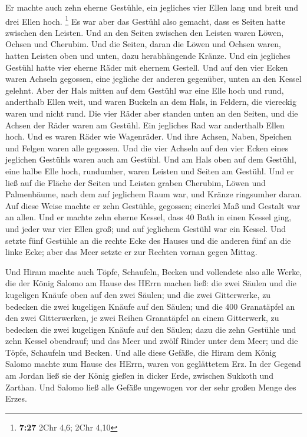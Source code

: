  Er machte auch zehn eherne Gestühle, ein jegliches vier
Ellen lang und breit und drei Ellen hoch. \footnote{\textbf{7:27} 2Chr
  4,6; 2Chr 4,10}  Es war aber das Gestühl also gemacht,
dass es Seiten hatte zwischen den Leisten.  Und an den
Seiten zwischen den Leisten waren Löwen, Ochsen und Cherubim. Und die
Seiten, daran die Löwen und Ochsen waren, hatten Leisten oben und unten,
dazu herabhängende Kränze.  Und ein jegliches Gestühl hatte
vier eherne Räder mit ehernem Gestell. Und auf den vier Ecken waren
Achseln gegossen, eine jegliche der anderen gegenüber, unten an den
Kessel gelehnt.  Aber der Hals mitten auf dem Gestühl war
eine Elle hoch und rund, anderthalb Ellen weit, und waren Buckeln an dem
Hals, in Feldern, die viereckig waren und nicht rund.  Die
vier Räder aber standen unten an den Seiten, und die Achsen der Räder
waren am Gestühl. Ein jegliches Rad war anderthalb Ellen hoch.
 Und es waren Räder wie Wagenräder. Und ihre Achsen, Naben,
Speichen und Felgen waren alle gegossen.  Und die vier
Achseln auf den vier Ecken eines jeglichen Gestühls waren auch am
Gestühl.  Und am Hals oben auf dem Gestühl, eine halbe Elle
hoch, rundumher, waren Leisten und Seiten am Gestühl.  Und
er ließ auf die Fläche der Seiten und Leisten graben Cherubim, Löwen und
Palmenbäume, nach dem auf jeglichem Raum war, und Kränze ringsumher
daran.  Auf diese Weise machte er zehn Gestühle, gegossen;
einerlei Maß und Gestalt war an allen.  Und er machte zehn
eherne Kessel, dass 40 Bath in einen Kessel ging, und jeder war vier
Ellen groß; und auf jeglichem Gestühl war ein Kessel.  Und
setzte fünf Gestühle an die rechte Ecke des Hauses und die anderen fünf
an die linke Ecke; aber das Meer setzte er zur Rechten vornan gegen
Mittag.

 Und Hiram machte auch Töpfe, Schaufeln, Becken und
vollendete also alle Werke, die der König Salomo am Hause des HErrn
machen ließ:  die zwei Säulen und die kugeligen Knäufe oben
auf den zwei Säulen; und die zwei Gitterwerke, zu bedecken die zwei
kugeligen Knäufe auf den Säulen;  und die 400 Granatäpfel
an den zwei Gitterwerken, je zwei Reihen Granatäpfel an einem
Gitterwerk, zu bedecken die zwei kugeligen Knäufe auf den Säulen;
 dazu die zehn Gestühle und zehn Kessel obendrauf;
 und das Meer und zwölf Rinder unter dem Meer;
 und die Töpfe, Schaufeln und Becken. Und alle diese
Gefäße, die Hiram dem König Salomo machte zum Hause des HErrn, waren von
geglättetem Erz.  In der Gegend am Jordan ließ sie der
König gießen in dicker Erde, zwischen Sukkoth und Zarthan. 
Und Salomo ließ alle Gefäße ungewogen vor der sehr großen Menge des
Erzes.

